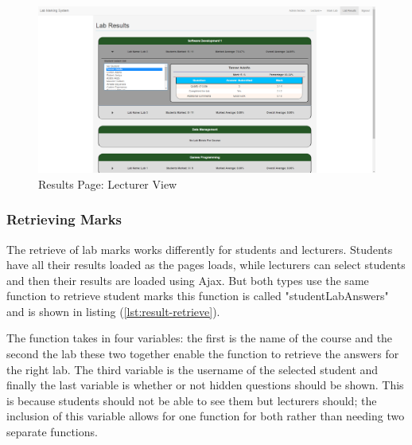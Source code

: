 \documentclass[12pt]{article}  %
\begin{document}
\begin{figure}[H]
    \centering
    \includegraphics[width=1\textwidth]{images/implementation/lecturer-results-page.png}
    \caption{Results Page: Lecturer View}
    \label{fig:results-lecturer}
\end{figure}


\subsubsection{Retrieving Marks}

The retrieve of lab marks works differently for students and lecturers. Students have all their results loaded as the pages loads, while lecturers can select students and then their results are loaded using Ajax. But both types use the same function to retrieve student marks this function is called "studentLabAnswers" and is shown in listing (\ref{lst:result-retrieve}). 

The function takes in four variables: the first is the name of the course and the second the lab these two together enable the function to retrieve the answers for the right lab. The third variable is the username of the selected student and finally the last variable is  whether or not hidden questions should be shown. This is because students should not be able to see them but lecturers should; the inclusion of this variable allows for one function for both rather than needing two separate functions.
\end{document}
